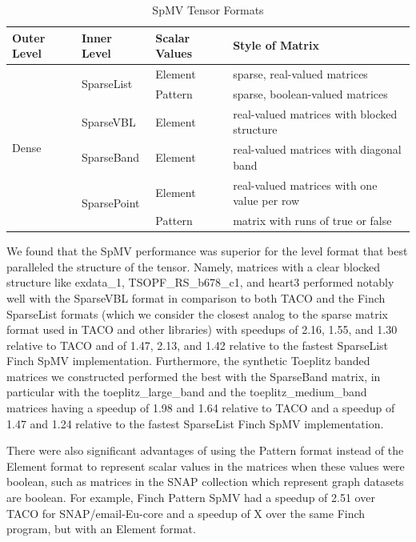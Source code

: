 \begin{table}[htbp]
    \centering
    \caption{SpMV Tensor Formats}
    \label{spmv_tensor_formats}
    \begin{tabular}{|l|l|l|l|}
        \hline
        \textbf{Outer Level} & \textbf{Inner Level} & \textbf{Scalar Values} & \textbf{Style of Matrix}\\
        \hline
        \multirow{6}{*}{Dense} & \multirow{2}{*}{SparseList} & Element & sparse, real-valued matrices \\
        \cline{3-4} 
        & & Pattern & sparse, boolean-valued matrices \\
        \cline{2-4} 
        & SparseVBL & Element & real-valued matrices with blocked structure \\
        \cline{2-4}
        & SparseBand & Element & real-valued matrices with diagonal band \\
        \cline{2-4}
        & \multirow{2}{*}{SparsePoint} & Element & real-valued matrices with one value per row \\
        \cline{3-4} 
        & & Pattern & matrix with runs of true or false \\
        \hline 
    \end{tabular}

\end{table}

We found that the SpMV performance was superior for the level format that best paralleled the structure of the tensor. Namely, matrices with a clear blocked structure like exdata\_1, TSOPF\_RS\_b678\_c1, and heart3 performed notably well with the SparseVBL format in comparison to both TACO and the Finch SparseList formats (which we consider the closest analog to the sparse matrix format used in TACO and other libraries) with speedups of 2.16, 1.55, and 1.30 relative to TACO and of 1.47, 2.13, and 1.42 relative to the fastest SparseList Finch SpMV implementation. Furthermore, the synthetic Toeplitz banded matrices we constructed performed the best with the SparseBand matrix, in particular with the toeplitz\_large\_band and the toeplitz\_medium\_band matrices having a speedup of 1.98 and 1.64 relative to TACO and a speedup of 1.47 and 1.24 relative to the fastest SparseList Finch SpMV implementation. 

There were also significant advantages of using the Pattern format instead of the Element format to represent scalar values in the matrices when these values were boolean, such as matrices in the SNAP collection which represent graph datasets are boolean. For example, Finch Pattern SpMV had a speedup of 2.51 over TACO for SNAP/email-Eu-core and a speedup of X over the same Finch program, but with an Element format.   


